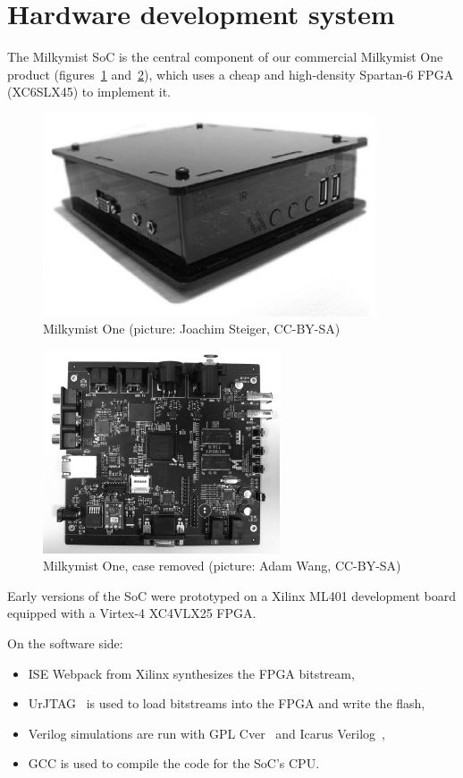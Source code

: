 \documentclass[a4paper,11pt,twocolumn]{paper}
\begin{document}
\section{Hardware development system}
The Milkymist SoC is the central component of our commercial Milkymist One product (figures~\ref{fig:mm1} and~\ref{fig:mm1nocase}), which uses a cheap and high-density Spartan-6 FPGA (XC6SLX45) to implement it.

\begin{figure}
\centering
\includegraphics[height=60mm]{mm1_bw.eps}
\caption{Milkymist One (picture: Joachim Steiger, CC-BY-SA)}
\label{fig:mm1}
\end{figure}

\begin{figure}
\centering
\includegraphics[height=60mm]{mm1nocase_bw.eps}
\caption{Milkymist One, case removed (picture: Adam Wang, CC-BY-SA)}
\label{fig:mm1nocase}
\end{figure}

Early versions of the SoC were prototyped on a Xilinx ML401 development board equipped with a Virtex-4 XC4VLX25 FPGA.

On the software side:
\begin{itemize}
\item ISE Webpack from Xilinx synthesizes the FPGA bitstream,
\item UrJTAG~\cite{urjtag} is used to load bitstreams into the FPGA and write the flash,
\item Verilog simulations are run with GPL Cver~\cite{gplcver} and Icarus Verilog~\cite{icarus},
\item GCC is used to compile the code for the SoC's CPU.
\end{itemize}
\end{document}

